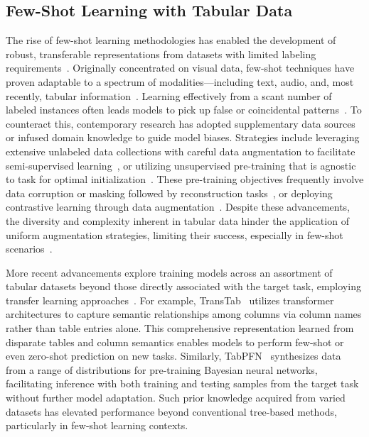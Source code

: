 \subsection{Few-Shot Learning with Tabular Data} The rise of few-shot learning methodologies has enabled the development of robust, transferable representations from datasets with limited labeling requirements~\cite{chen2018closer}. Originally concentrated on visual data, few-shot techniques have proven adaptable to a spectrum of modalities—including text, audio, and, most recently, tabular information~\cite{majumder2022few,nam2023stunt,schick2021exploiting}. Learning effectively from a scant number of labeled instances often leads models to pick up false or coincidental patterns~\cite{bartlett2021deep}. To counteract this, contemporary research has adopted supplementary data sources or infused domain knowledge to guide model biases. Strategies include leveraging extensive unlabeled data collections with careful data augmentation to facilitate semi-supervised learning~\cite{ucar2021subtab,yoon2020vime}, or utilizing unsupervised pre-training that is agnostic to task for optimal initialization~\cite{somepalli2021saint}. These pre-training objectives frequently involve data corruption or masking followed by reconstruction tasks~\cite{arik2021tabnet,majmundar2022met}, or deploying contrastive learning through data augmentation~\cite{bahri2022scarf,chen2020simple}. Despite these advancements, the diversity and complexity inherent in tabular data hinder the application of uniform augmentation strategies, limiting their success, especially in few-shot scenarios~\cite{nam2023stunt}. 

More recent advancements explore training models across an assortment of tabular datasets beyond those directly associated with the target task, employing transfer learning approaches~\cite{zhang2023generative,levin2022transfer,zhu2023xtab}. For example, TransTab~\cite{wang2022transtab} utilizes transformer architectures to capture semantic relationships among columns via column names rather than table entries alone. This comprehensive representation learned from disparate tables and column semantics enables models to perform few-shot or even zero-shot prediction on new tasks. Similarly, TabPFN~\cite{hollmann2022tabpfn} synthesizes data from a range of distributions for pre-training Bayesian neural networks, facilitating inference with both training and testing samples from the target task without further model adaptation. Such prior knowledge acquired from varied datasets has elevated performance beyond conventional tree-based methods, particularly in few-shot learning contexts.


